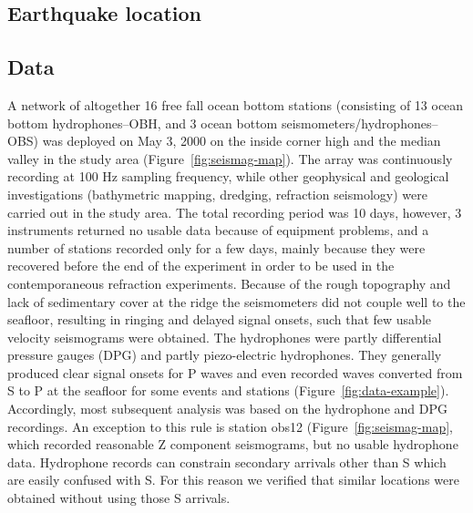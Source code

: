 \documentclass[jgr]{agu2001}
\newlength{\tw}
\begin{document}
\begin{article}
\section{Earthquake location}

\subsection{Data}

A network of altogether 16 free fall ocean bottom stations (consisting
of 13 ocean bottom hydro\-phones--OBH, and 3 ocean bottom seismometers/hydro\-phones--OBS) was deployed
on May 3, 2000 on the inside corner high and the median valley in the
study area (Figure~\ref{fig:seismag-map}).  The array was continuously recording at 100 Hz sampling frequency, while other
geophysical and geological investigations (bathymetric mapping,
dredging, refraction seismology) were carried out in the study area.
The total recording period was 10 days, however, 3 instruments
returned no usable data because of equipment problems, and a number of
stations recorded only for a few days, mainly because they were
recovered before the end of the experiment in order to be used in the
contemporaneous refraction experiments.  Because of the rough
topography and lack of sedimentary cover at the ridge the seismometers
did not couple well to the seafloor, resulting in ringing and delayed
signal onsets, such that few usable velocity seismograms were
obtained.  The hydrophones were partly differential pressure gauges
(DPG) and partly piezo-electric hydrophones.
They generally produced clear signal onsets for
P waves and even recorded waves converted from S to P at the seafloor
for some events and stations
(Figure~\ref{fig:data-example}). Accordingly, most subsequent analysis
was based on the hydrophone and DPG recordings.  An
exception to this rule is station obs12 (Figure~\ref{fig:seismag-map}, which recorded reasonable Z
component seismograms, but no usable hydrophone data.  Hydrophone
records can constrain secondary arrivals other than S which are easily
confused with S.  For this reason we verified that similar locations
were obtained without using those S arrivals.


\end{article}
\end{document}
